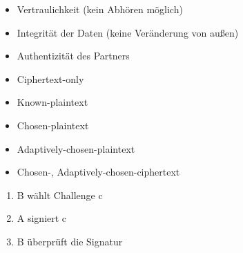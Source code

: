 \begin{itemize}
	\item Vertraulichkeit (kein Abhören möglich)
	\item Integrität der Daten (keine Veränderung von außen)
	\item Authentizität des Partners
\end{itemize}



\begin{itemize}
	\item Ciphertext-only
	\item Known-plaintext
	\item Chosen-plaintext
	\item Adaptively-chosen-plaintext
	\item Chosen-, Adaptively-chosen-ciphertext
\end{itemize}

\begin{enumerate}
	\item B wählt Challenge c  
	\item A signiert c 
	\item B überprüft die Signatur
\end{enumerate}

\clearpage